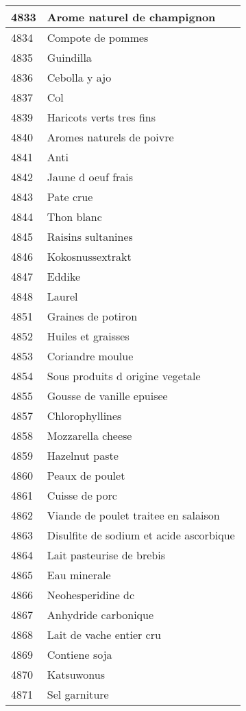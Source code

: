 \begin{longtable}{|l|l|}
4833 & Arome naturel de champignon \\ \hline 
4834 & Compote de pommes \\ \hline 
4835 & Guindilla \\ \hline 
4836 & Cebolla y ajo \\ \hline 
4837 & Col \\ \hline 
4839 & Haricots verts tres fins \\ \hline 
4840 & Aromes naturels de poivre \\ \hline 
4841 & Anti \\ \hline 
4842 & Jaune d oeuf frais \\ \hline 
4843 & Pate crue \\ \hline 
4844 & Thon blanc \\ \hline 
4845 & Raisins sultanines \\ \hline 
4846 & Kokosnussextrakt \\ \hline 
4847 & Eddike \\ \hline 
4848 & Laurel \\ \hline 
4851 & Graines de potiron \\ \hline 
4852 & Huiles et graisses \\ \hline 
4853 & Coriandre moulue \\ \hline 
4854 & Sous produits d origine vegetale \\ \hline 
4855 & Gousse de vanille epuisee \\ \hline 
4857 & Chlorophyllines \\ \hline 
4858 & Mozzarella cheese \\ \hline 
4859 & Hazelnut paste \\ \hline 
4860 & Peaux de poulet \\ \hline 
4861 & Cuisse de porc \\ \hline 
4862 & Viande de poulet traitee en salaison \\ \hline 
4863 & Disulfite de sodium et acide ascorbique \\ \hline 
4864 & Lait pasteurise de brebis \\ \hline 
4865 & Eau minerale \\ \hline 
4866 & Neohesperidine dc \\ \hline 
4867 & Anhydride carbonique \\ \hline 
4868 & Lait de vache entier cru \\ \hline 
4869 & Contiene soja \\ \hline 
4870 & Katsuwonus \\ \hline 
4871 & Sel garniture \\ \hline 

\end{longtable}
